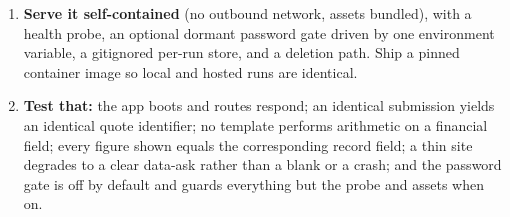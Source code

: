 \begin{rebuild}
\begin{enumerate}
  \item \textbf{Serve it self-contained} (no outbound network, assets bundled), with a health probe, an optional dormant password gate driven by one environment variable, a gitignored per-run store, and a deletion path. Ship a pinned container image so local and hosted runs are identical.
  \item \textbf{Test that:} the app boots and routes respond; an identical submission yields an identical quote identifier; no template performs arithmetic on a financial field; every figure shown equals the corresponding record field; a thin site degrades to a clear data-ask rather than a blank or a crash; and the password gate is off by default and guards everything but the probe and assets when on.
\end{enumerate}
\end{rebuild}
